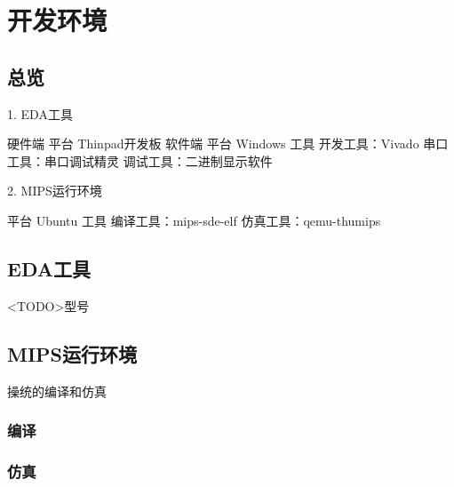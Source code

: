\chapter{开发环境}


%
%
%

\section{总览}

1. EDA工具

硬件端 平台  Thinpad开发板
软件端 平台  Windows
      工具  开发工具：Vivado
            串口工具：串口调试精灵
            调试工具：二进制显示软件

2. MIPS运行环境

平台 Ubuntu
工具     编译工具：mips-sde-elf
        仿真工具：qemu-thumips

\section{EDA工具}
<TODO>型号

\section{MIPS运行环境}

操统的编译和仿真

\subsection{编译}
\subsection{仿真}

